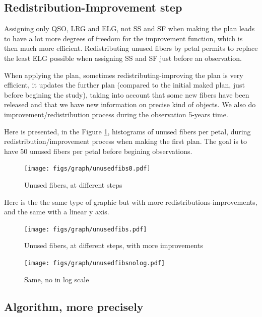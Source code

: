 \documentclass{article}
\begin{document}
\subsection{Redistribution-Improvement step}
Assigning only QSO, LRG and ELG, not SS and SF when making the plan leads to have a lot more degrees of freedom for the improvement function, which is then much more efficient. Redistributing unused fibers by petal permits to replace the least ELG possible when assigning SS and SF just before an observation.

When applying the plan, sometimes redistributing-improving the plan is very efficient, it updates the further plan (compared to the initial maked plan, just before begining the study), taking into account that some new fibers have been released and that we have new information on precise kind of objects.
We also do improvement/redistribution process during the observation 5-years time.

Here is presented, in the Figure \ref{unusedfibs0}, histograms of unused fibers per petal, during redistribution/improvement process when making the first plan. The goal is to have 50 unused fibers per petal before begining observations.

\begin{figure}[H]\begin{center}
	\texttt{[image: figs/graph/unusedfibs0.pdf]}
	\caption{Unused fibers, at different steps}\label{unusedfibs0}
\end{center}\end{figure}

Here is the the same type of graphic but with more redistributions-improvements, and the same with a linear y axis.

\begin{figure}[H]\begin{center}
	\texttt{[image: figs/graph/unusedfibs.pdf]}
	\caption{Unused fibers, at different steps, with more improvements}\label{unusedfibs}
\end{center}\end{figure}

\begin{figure}[H]\begin{center}
	\texttt{[image: figs/graph/unusedfibsnolog.pdf]}
	\caption{Same, no in log scale}\label{unusedfibsnolog}
\end{center}\end{figure}


\subsection{Algorithm, more precisely}
\end{document}
